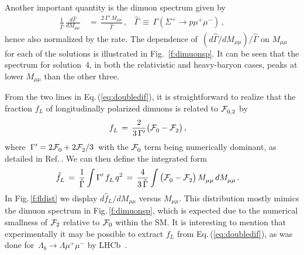 \documentclass[amsmath,amssymb,aps,nofootinbib,prd,preprint,superscriptaddress,tightenlines,a4paper,bm]{revtex4-2}
\begin{document}
Another important quantity is the dimuon spectrum given by
\begin{align} \label{spectrum}
\frac{1}{\hat\Gamma}\, \frac{d\hat\Gamma}{dM_{\mu\mu}} & \,=\, \frac{2\,\Gamma'\, M_{\mu\mu}}{\hat\Gamma} \,, & \hat\Gamma \,\equiv\, \Gamma(\Sigma^+\to p\mu^+\mu^-) \,, & & &
\end{align}
hence also normalized by the rate.
The dependence of \,$(d\hat\Gamma/dM_{\mu\mu})/\hat\Gamma$ on $M_{\mu\mu}$ for each of the solutions is illustrated in Fig.~\ref{f:dimuonsp}.
It can be seen that the spectrum for solution~4, in both the relativistic and heavy-baryon cases, peaks at lower $M_{\mu\mu}$ than the other three.

From the two lines in Eq.\,(\ref{eq:doubledif}), it is straightforward to realize that the fraction $f_L^{}$ of longitudinally polarized dimuons is related to ${\cal F}_{0,2}^{}$ by
\begin{align}
    f_L^{} & \,=\, \frac{2}{3\, \Gamma'} \big({\cal F}_0^{}-{\cal F}_2^{}\big) \,, &
\end{align}
where \,$\Gamma'=2{\cal F}_0^{}+2{\cal F}_2^{}/3$\, with the ${\cal F}_0^{}$ term being numerically dominant, as detailed in Ref.\,\cite{He:2018yzu}.
We can then define the integrated form
\begin{align}
\hat f_L^{} & \,=\, \frac{1}{\hat\Gamma} \int \Gamma'\, f_L^{}\, q^2 \,=\, \frac{4}{3\, \hat\Gamma} \int \big({\cal F}_0^{}-{\cal F}_2^{}\big)\, M_{\mu\mu}^{}\, dM_{\mu\mu}^{} \,. &   \label{fldist}
\end{align}
In Fig.\,\ref{f:fldist} we display $d\hat f_L^{}/dM_{\mu\mu}$ versus $M_{\mu\mu}$.
This distribution mostly mimics the dimuon spectrum in Fig.\,\ref{f:dimuonsp}, which is expected due to the numerical smallness of ${\cal F}_2$ relative to ${\cal F}_0$ within the SM.
It is interesting to mention that experimentally it may be possible to extract $f_L^{}$ from Eq.\,(\ref{eq:doubledif}), as was done for \,$\Lambda_b\to\Lambda\mu^+\mu^-$  by LHCb~\cite{LHCb:2015tgy}.
\end{document}
